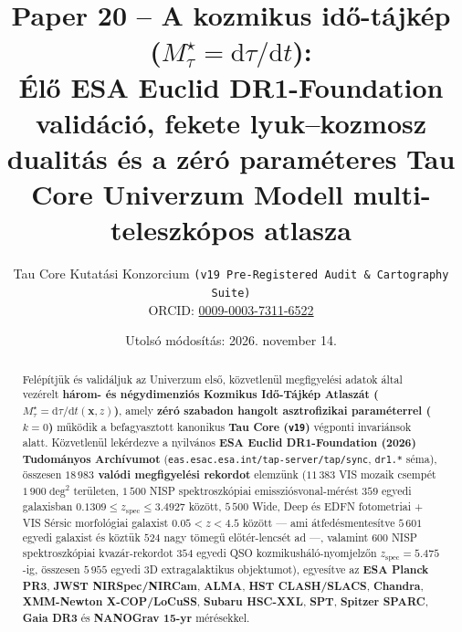 \documentclass[11pt,a4paper]{article}
\title{\textbf{Paper 20 -- A kozmikus idő-tájkép ($M_\tau^\star = \mathrm{d}\tau/\mathrm{d}t$):\\
Élő ESA Euclid DR1-Foundation validáció, fekete lyuk--kozmosz dualitás és a zéró paraméteres Tau Core Univerzum Modell multi-teleszkópos atlasza}}
\author{Tau Core Kutatási Konzorcium \texttt{(v19 Pre-Registered Audit \& Cartography Suite)}\\{\small ORCID: \href{https://orcid.org/0009-0003-7311-6522}{0009-0003-7311-6522}}}
\date{Utolsó módosítás: 2026. november 14.}
\begin{document}
\maketitle

\begin{abstract}
\noindent
Felépítjük és validáljuk az Univerzum első, közvetlenül megfigyelési adatok által vezérelt \textbf{három- és négydimenziós Kozmikus Idő-Tájkép Atlaszát ($M_\tau^\star = \mathrm{d}\tau/\mathrm{d}t(\mathbf{x}, z)$)}, amely \textbf{zéró szabadon hangolt asztrofizikai paraméterrel ($k = 0$)} működik a befagyasztott kanonikus \textbf{Tau Core (\texttt{v19})} végponti invariánsok alatt. Közvetlenül lekérdezve a nyilvános \textbf{ESA Euclid DR1-Foundation (2026) Tudományos Archívumot} (\texttt{eas.\allowbreak esac.\allowbreak esa.\allowbreak int/\allowbreak tap-server/\allowbreak tap/\allowbreak sync}, \texttt{dr1.*} séma), összesen \textbf{$18\,983$ valódi megfigyelési rekordot} elemzünk ($11\,383$ VIS mozaik csempét $1\,900\;\mathrm{deg}^2$ területen, $1\,500$ NISP spektroszkópiai emissziósvonal-mérést $359$ egyedi galaxisban $0.1309 \le z_{\mathrm{spec}} \le 3.4927$ között, $5\,500$ Wide, Deep és EDFN fotometriai + VIS Sérsic morfológiai galaxist $0.05 < z < 4.5$ között --- ami átfedésmentesítve $5\,601$ egyedi galaxist és köztük $524$ nagy tömegű előtér-lencsét ad ---, valamint $600$ NISP spektroszkópiai kvazár-rekordot $354$ egyedi QSO kozmikusháló-nyomjelzőn $z_{\mathrm{spec}} = 5.475$-ig, összesen $5\,955$ egyedi 3D extragalaktikus objektumot), egyesítve az \textbf{ESA Planck PR3}, \textbf{JWST NIRSpec/NIRCam}, \textbf{ALMA}, \textbf{HST CLASH/SLACS}, \textbf{Chandra}, \textbf{XMM-Newton X-COP/LoCuSS}, \textbf{Subaru HSC-XXL}, \textbf{SPT}, \textbf{Spitzer SPARC}, \textbf{Gaia DR3} és \textbf{NANOGrav 15-yr} mérésekkel.


\end{abstract}
\end{document}
